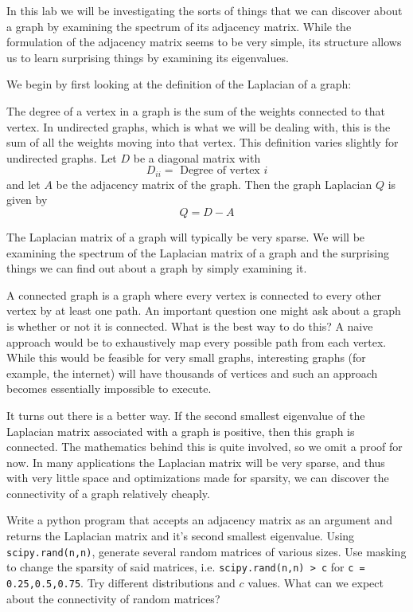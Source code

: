 In this lab we will be investigating the sorts of things that we can discover about a graph by examining the spectrum of its  adjacency matrix.  While the formulation of the adjacency matrix seems to be very simple, its structure allows us to learn surprising things by examining its eigenvalues.  

We begin by first looking at the definition of the Laplacian of a graph:

\begin{definition}  The degree of a vertex in a graph is the sum of the weights connected to that vertex.  In undirected graphs, which is what we will be dealing with, this is the sum of all the weights moving into that vertex.  This definition varies slightly for undirected graphs. Let $D$ be a diagonal matrix with
\[
D_{ii} = \mbox{ Degree of vertex $i$}
\]
and let $A$ be the adjacency matrix of the graph.  Then the graph Laplacian $Q$ is given by
\[
Q = D-A
\]
\end{definition}

The Laplacian matrix of a graph will typically be very sparse.  We will be examining the spectrum of the Laplacian matrix of a graph and the surprising things we can find out about a graph by simply examining it.    

A connected graph is a graph where every vertex is connected to every other vertex by at least one path.  An important question one might ask about a graph is whether or not it is connected.  What is the best way to do this?  A naive approach would be to exhaustively map every possible path from each vertex.  While this would be feasible for very small graphs, interesting graphs (for example, the internet) will have thousands of vertices and such an approach becomes essentially impossible to execute.

It turns out there is a better way.  If the second smallest eigenvalue of the Laplacian matrix associated with a graph is positive, then this graph is connected.  The mathematics behind this is quite involved, so we omit a proof for now.  In many applications the Laplacian matrix will be very sparse, and thus with very little space and optimizations made for sparsity, we can discover the connectivity of a graph relatively cheaply.

\begin{problem}Write a python program that accepts an adjacency matrix as an argument and returns the Laplacian matrix and it's second smallest eigenvalue.  Using {\tt scipy.rand(n,n)}, generate several random matrices of various sizes.  Use masking to change the sparsity of said matrices, i.e. {\tt scipy.rand(n,n) > c} for {\tt c = 0.25,0.5,0.75}.  Try different distributions and $c$ values.  What can we expect about the connectivity of random matrices?
\end{problem}

